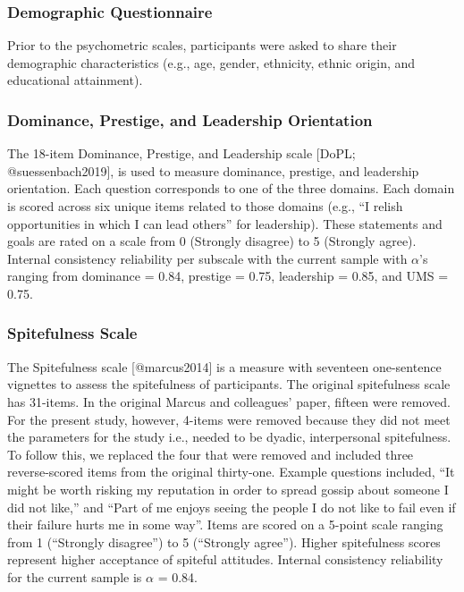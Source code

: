 \documentclass[
]{article}
\begin{document}
\hypertarget{demographic-questionnaire}{%
\subsubsection{Demographic
Questionnaire}\label{demographic-questionnaire}}

Prior to the psychometric scales, participants were asked to share their
demographic characteristics (e.g., age, gender, ethnicity, ethnic
origin, and educational attainment).

\hypertarget{dominance-prestige-and-leadership-orientation-1}{%
\subsubsection{Dominance, Prestige, and Leadership
Orientation}\label{dominance-prestige-and-leadership-orientation-1}}

The 18-item Dominance, Prestige, and Leadership scale {[}DoPL;
@suessenbach2019{]}, is used to measure dominance, prestige, and
leadership orientation. Each question corresponds to one of the three
domains. Each domain is scored across six unique items related to those
domains (e.g., ``I relish opportunities in which I can lead others'' for
leadership). These statements and goals are rated on a scale from 0
(Strongly disagree) to 5 (Strongly agree). Internal consistency
reliability per subscale with the current sample with \(\alpha\)'s
ranging from dominance = 0.84, prestige = 0.75, leadership = 0.85, and
UMS = 0.75.

\hypertarget{spitefulness-scale}{%
\subsubsection{Spitefulness Scale}\label{spitefulness-scale}}

The Spitefulness scale {[}@marcus2014{]} is a measure with seventeen
one-sentence vignettes to assess the spitefulness of participants. The
original spitefulness scale has 31-items. In the original Marcus and
colleagues' paper, fifteen were removed. For the present study, however,
4-items were removed because they did not meet the parameters for the
study i.e., needed to be dyadic, interpersonal spitefulness. To follow
this, we replaced the four that were removed and included three
reverse-scored items from the original thirty-one. Example questions
included, ``It might be worth risking my reputation in order to spread
gossip about someone I did not like,'' and ``Part of me enjoys seeing
the people I do not like to fail even if their failure hurts me in some
way''. Items are scored on a 5-point scale ranging from 1 (``Strongly
disagree'') to 5 (``Strongly agree''). Higher spitefulness scores
represent higher acceptance of spiteful attitudes. Internal consistency
reliability for the current sample is \(\alpha\) = 0.84.
\end{document}
